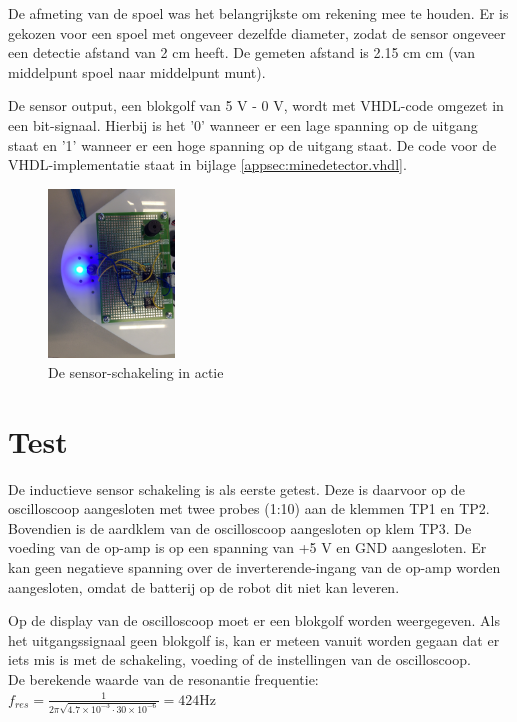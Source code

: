 \documentclass{report}
\begin{document}
De afmeting van de spoel was het belangrijkste om rekening mee te houden. Er is gekozen voor een spoel met ongeveer dezelfde diameter, zodat de sensor ongeveer een detectie afstand van 2 cm heeft. De gemeten afstand is 2.15 cm  cm (van middelpunt spoel naar middelpunt munt).

De sensor output, een blokgolf van 5 V - 0 V, wordt met VHDL-code omgezet in een bit-signaal. Hierbij is het '0' wanneer er een lage spanning op de uitgang staat en '1' wanneer er een hoge spanning op de uitgang staat. De code voor de VHDL-implementatie staat in bijlage \ref{appsec:minedetector.vhdl}.

\begin{figure}[H]
	\centering
	\includegraphics[width=0.3\textwidth]{sensor-schakeling.jpg}
	\caption{De sensor-schakeling in actie}
	\label{fig:sensor-schakeling}
\end{figure}


\section{Test}
De inductieve sensor schakeling is als eerste getest. Deze is daarvoor op de oscilloscoop aangesloten met twee probes (1:10) aan de klemmen TP1 en TP2. Bovendien is de aardklem van de oscilloscoop aangesloten op klem TP3. De voeding van de op-amp is op een spanning van +5 V en GND aangesloten. Er kan geen negatieve spanning over de inverterende-ingang van de op-amp worden aangesloten, omdat de batterij op de robot dit niet kan leveren. 

Op de display van de oscilloscoop moet er een blokgolf worden weergegeven. Als het uitgangssignaal geen blokgolf is, kan er meteen vanuit worden gegaan dat er iets mis is met de schakeling, voeding of de instellingen van de oscilloscoop.\\
De berekende waarde van de resonantie frequentie:
$f_{res}=\frac{1}{2\pi \sqrt{4.7\times 10^{-3}\cdot 30\times 10^{-6}}}= 424 \mathrm{Hz}$
\end{document}
